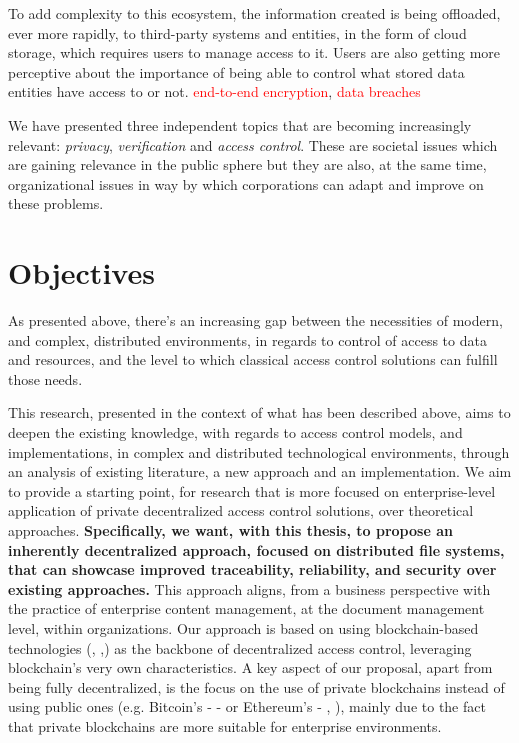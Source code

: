 To add complexity to this ecosystem, the information created is being offloaded, ever more rapidly, to third-party systems and entities, in the form of cloud storage, which requires users to manage access to it. Users are also getting more perceptive about the importance of being able to control what stored data entities have access to or not. \textcolor{red}{end-to-end encryption}, \textcolor{red}{data breaches} 

We have presented three independent topics that are becoming increasingly relevant: \textit{privacy}, \textit{verification} and \textit{access control}. These are societal issues which are gaining relevance in the public sphere but they are also, at the same time, organizational issues in way by which corporations can adapt and improve on these problems.

\section{Objectives}

As presented above, there's an increasing gap between the necessities of modern, and complex, distributed environments, in regards to control of access to data and resources, and the level to which classical access control solutions can fulfill those needs.

This research, presented in the context of what has been described above, aims to deepen the existing knowledge, with regards to access control models, and implementations, in complex and distributed technological environments, through an analysis of existing literature, a new approach and an implementation. We aim to provide a starting point, for research that is more focused on enterprise-level application of private decentralized access control solutions, over theoretical approaches. \textbf{Specifically, we want, with this thesis, to propose an inherently decentralized approach, focused on distributed file systems, that can showcase improved traceability, reliability, and security over existing approaches.} This approach aligns, from a business perspective with the practice of enterprise content management, at the document management level, within organizations. Our approach is based on using blockchain-based technologies (\cite{nakamoto_bitcoin:_2008}, \cite{buterin_next-generation_2013},\cite{wood_ethereum:_2014}) as the backbone of decentralized access control, leveraging blockchain's very own characteristics. A key aspect of our proposal, apart from being fully decentralized, is the focus on the use of private blockchains instead of using public ones (e.g. Bitcoin's - \cite{nakamoto_bitcoin:_2008} - or Ethereum's - \cite{buterin_next-generation_2013}, \cite{wood_ethereum:_2014}), mainly due to the fact that private blockchains are more suitable for enterprise environments.

